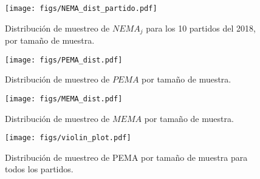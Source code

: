 \documentclass[]{article}
\begin{document}
\begin{figure}[!htpb]
  \centering
      \texttt{[image: figs/NEMA\_dist\_partido.pdf]}
  \caption{Distribución de muestreo de $NEMA_j$ para los 10 partidos del 2018, por tamaño de muestra.}
  \label{fig:nemaj}
\end{figure}


\begin{figure}[!htpb]
  \centering
      \texttt{[image: figs/PEMA\_dist.pdf]}
      \caption{Distribución de muestreo de $PEMA$ por tamaño de muestra.}
      \label{fig:pema}
\end{figure}

\begin{figure}[!htpb]
  \centering
      \texttt{[image: figs/MEMA\_dist.pdf]}
      \caption{Distribución de muestreo de $MEMA$ por tamaño de muestra.}
      \label{fig:mema}
\end{figure}

\begin{figure}[!htpb]
  \centering
      \texttt{[image: figs/violin\_plot.pdf]}
      \caption{Distribución de muestreo de PEMA por tamaño de muestra para todos los partidos.}
      \label{fig:pemall}
\end{figure}

\end{document}
